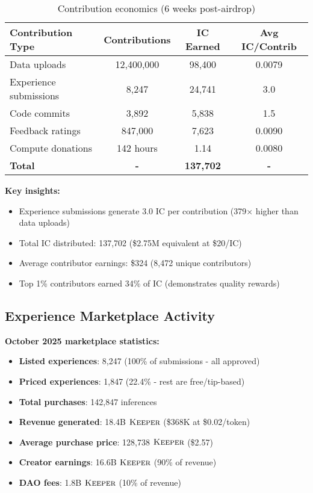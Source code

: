 \documentclass[11pt,letterpaper]{article}
\theoremstyle{definition}
\theoremstyle{remark}
\newcommand{\KEEPER}{\textsc{Keeper}}
\begin{document}
\begin{table}[h]
\centering
\begin{tabular}{lccc}
\toprule
\textbf{Contribution Type} & \textbf{Contributions} & \textbf{IC Earned} & \textbf{Avg IC/Contrib} \\
\midrule
Data uploads & 12,400,000 & 98,400 & 0.0079 \\
Experience submissions & 8,247 & 24,741 & 3.0 \\
Code commits & 3,892 & 5,838 & 1.5 \\
Feedback ratings & 847,000 & 7,623 & 0.0090 \\
Compute donations & 142 hours & 1.14 & 0.0080 \\
\textbf{Total} & \textbf{-} & \textbf{137,702} & \textbf{-} \\
\bottomrule
\end{tabular}
\caption{Contribution economics (6 weeks post-airdrop)}
\label{tab:contribution_econ}
\end{table}

\textbf{Key insights:}
\begin{itemize}
\item Experience submissions generate 3.0 IC per contribution (379× higher than data uploads)
\item Total IC distributed: 137,702 (\$2.75M equivalent at \$20/IC)
\item Average contributor earnings: \$324 (8,472 unique contributors)
\item Top 1\% contributors earned 34\% of IC (demonstrates quality rewards)
\end{itemize}

\subsection{Experience Marketplace Activity}

\textbf{October 2025 marketplace statistics:}

\begin{itemize}
\item \textbf{Listed experiences}: 8,247 (100\% of submissions - all approved)
\item \textbf{Priced experiences}: 1,847 (22.4\% - rest are free/tip-based)
\item \textbf{Total purchases}: 142,847 inferences
\item \textbf{Revenue generated}: 18.4B $\KEEPER$ (\$368K at \$0.02/token)
\item \textbf{Average purchase price}: 128,738 $\KEEPER$ (\$2.57)
\item \textbf{Creator earnings}: 16.6B $\KEEPER$ (90\% of revenue)
\item \textbf{DAO fees}: 1.8B $\KEEPER$ (10\% of revenue)
\end{itemize}
\end{document}
